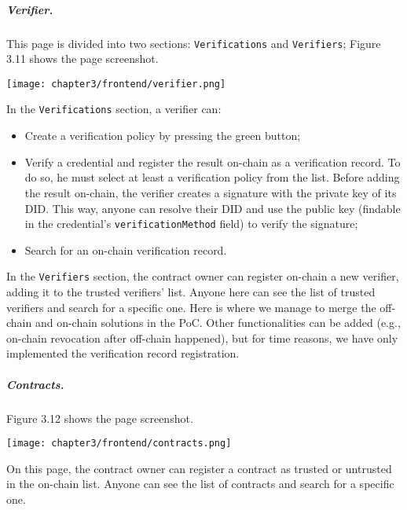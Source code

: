 \clearpage
\subparagraph{Verifier.} This page is divided into two sections: \texttt{Verifications}
and \texttt{Verifiers}; Figure 3.11 shows the page screenshot.
\begin{center}
    \begin{tcolorbox}[
        beamer,
        width=0.6\textheight,
        arc=0pt,
        boxsep=0pt,
        left=0pt,right=0pt,top=0pt,bottom=0pt,
        ]
    \texttt{[image: chapter3/frontend/verifier.png]}
    \end{tcolorbox}
\end{center}
\vspace{0.3cm}
In the \texttt{Verifications} section, a verifier can:
\begin{itemize}
    \item Create a verification policy by pressing the green button;
    \item Verify a credential and register the result on-chain as a verification record. 
    To do so, he must select at least a verification policy from the list.
    Before adding the result on-chain, the verifier creates a signature with the 
    private key of its DID. This way, anyone can resolve their DID and use the public 
    key (findable in the credential's \texttt{verificationMethod} field) to verify the 
    signature;
    \item Search for an on-chain verification record.
\end{itemize}
\vspace*{0.3cm}
In the \texttt{Verifiers} section, the contract owner can register on-chain a new 
verifier, adding it to the trusted verifiers' list. Anyone here can see the list of
trusted verifiers and search for a specific one.
Here is where we manage to merge the off-chain and on-chain solutions in
the PoC. Other functionalities can be added (e.g., on-chain revocation after off-chain
happened), but for time reasons, we have only implemented the verification record 
registration.

\clearpage
\subparagraph{Contracts.} Figure 3.12 shows the page screenshot.
\begin{center}
    \begin{tcolorbox}[
        beamer,
        width=0.6\textheight,
        arc=0pt,
        boxsep=0pt,
        left=0pt,right=0pt,top=0pt,bottom=0pt,
        ]
    \texttt{[image: chapter3/frontend/contracts.png]}
    \end{tcolorbox}
\end{center}
On this page, the contract owner can register a contract as trusted or untrusted
in the on-chain list. Anyone can see the list of contracts and search for
a specific one.

